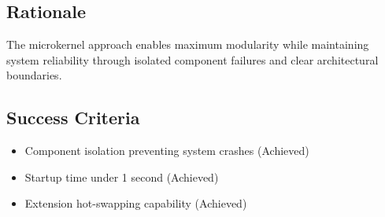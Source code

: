 \subsection*{Rationale}

The microkernel approach enables maximum modularity while maintaining system reliability through isolated component failures and clear architectural boundaries.

\subsection*{Success Criteria}

\begin{itemize}
\item Component isolation preventing system crashes (Achieved)
\item Startup time under 1 second (Achieved)
\item Extension hot-swapping capability (Achieved)
\end{itemize}
